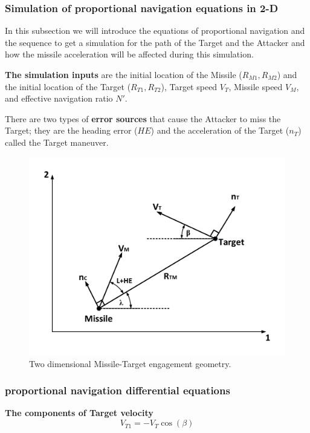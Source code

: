 \subsubsection{Simulation of proportional navigation equations in 2-D}
\label{PNeqations}
In this subsection we will introduce the equations of proportional navigation and the sequence to get a simulation for the path of the Target and the Attacker and how the missile acceleration will be affected during this simulation.

\textbf{The simulation inputs} are the initial location of the Missile ($R_{M1}, R_{M2}$) and the initial location of the Target ($R_{T1}, R_{T2}$), Target speed $V_T$, Missile speed $V_M$, and effective navigation ratio $N'$.

There are two types of \textbf{error sources} that cause the Attacker to miss the Target; they are the heading error ($HE$) and the acceleration of the Target ($n_T$) called the Target maneuver.

\begin{figure}[htb]
	\centering
	\includegraphics[scale = 0.65]{fig/PN.pdf}
	\caption{Two dimensional Missile-Target engagement geometry.}
	\label{PN}
\end{figure}


\subsubsection*{proportional navigation differential equations}

\textbf{The components of Target velocity} 
\begin{equation}
V_{T1} = - V_T \cos(\beta)
\end{equation}

